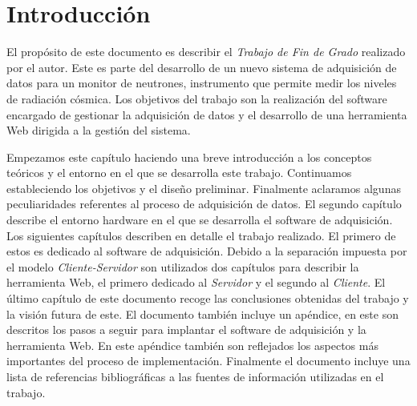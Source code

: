 \chapter{Introducción}
\label{cap1}

El propósito de este documento es describir el \emph{Trabajo de Fin de Grado} realizado por el autor. Este es parte del desarrollo de un nuevo sistema de
adquisición de datos para un monitor de neutrones, instrumento que permite medir los niveles de radiación cósmica. Los objetivos del trabajo son la
realización del software encargado de gestionar la adquisición de datos y el desarrollo de una herramienta Web dirigida a la gestión del sistema.	
\par
Empezamos este capítulo haciendo una breve introducción a los conceptos teóricos y el entorno en el que se desarrolla este trabajo. Continuamos
estableciendo los objetivos y el diseño preliminar. Finalmente aclaramos algunas peculiaridades referentes al proceso de adquisición de datos. El
segundo capítulo describe el entorno hardware en el que se desarrolla el software de adquisición. Los siguientes capítulos describen en detalle el
trabajo realizado. El primero de estos es dedicado al software de adquisición. Debido a la separación impuesta por el modelo \emph{Cliente-Servidor}
son utilizados dos capítulos para describir la herramienta Web, el primero dedicado al \emph{Servidor} y el segundo al \emph{Cliente}. El último
capítulo de este documento recoge las conclusiones obtenidas del trabajo y la visión futura de este. El documento también incluye un apéndice, en este
son descritos los pasos a seguir para implantar el software de adquisición y la herramienta Web. En este apéndice también son reflejados los aspectos
más importantes del proceso de implementación. Finalmente el documento incluye una lista de referencias bibliográficas a las fuentes de información
utilizadas en el trabajo. 

